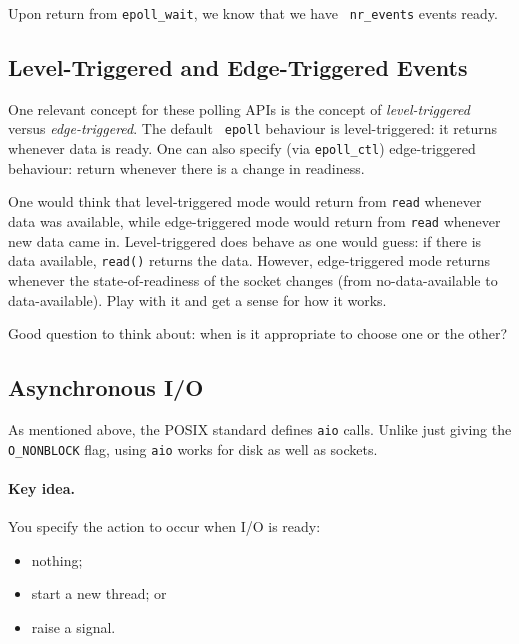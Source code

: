 Upon return from {\tt epoll\_wait}, we know that we have {\tt
  nr\_events} events ready.

\subsection*{Level-Triggered and Edge-Triggered Events}
One relevant concept for these polling APIs is the concept of
\emph{level-triggered} versus \emph{edge-triggered}.  The default {\tt
  epoll} behaviour is level-triggered: it returns whenever data is
ready. One can also specify (via {\tt epoll\_ctl}) edge-triggered
behaviour: return whenever there is a change in readiness.


One would think that level-triggered mode would return from {\tt read}
whenever data was available, while edge-triggered mode would return
from {\tt read} whenever new data came in. Level-triggered does behave
as one would guess: if there is data available, {\tt read()} returns
the data. However, edge-triggered mode returns whenever the
state-of-readiness of the socket changes (from no-data-available to
data-available). Play with it and get a sense for how it works.

Good question to think about: when is it appropriate to choose one or the other?

\subsection*{Asynchronous I/O}
As mentioned above, the POSIX standard defines {\tt aio} calls.
Unlike just giving the {\tt O\_NONBLOCK} flag, using {\tt aio} works
for disk as well as sockets.

\paragraph{Key idea.} You specify the action to occur when I/O is ready:
    \begin{itemize}
      \item nothing;
      \item start a new thread; or
      \item raise a signal.
    \end{itemize}

